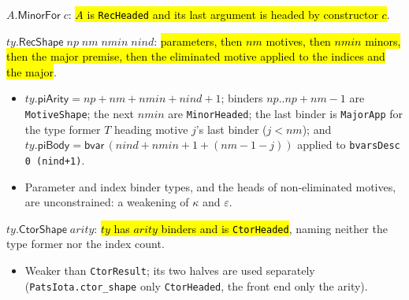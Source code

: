 \begin{definition}
\label{def:ind-minor-for}
\leanok
{} 

 $A.\mathsf{MinorFor}\;c$: \hl{$A$ is \texttt{RecHeaded} and its last argument
is headed by constructor $c$}.
\end{definition}

\begin{definition}
\label{def:ind-rec-shape}
\leanok
{} 

 $ty.\mathsf{RecShape}\;np\;nm\;nmin\;nind$: \hl{parameters, then $nm$
motives, then $nmin$ minors, then the major premise, then the eliminated motive applied to
the indices and the major}.
\begin{itemize}
\item $ty.\mathsf{piArity} = np+nm+nmin+nind+1$; binders $np..np{+}nm{-}1$ are
\texttt{MotiveShape}; the next $nmin$ are \texttt{MinorHeaded}; the last binder is
\texttt{MajorApp} for the type former $T$ heading motive $j$'s last binder ($j<nm$); and
$ty.\mathsf{piBody} = \mathsf{bvar}\,(nind+nmin+1+(nm-1-j))$ applied to
\texttt{bvarsDesc 0 (nind+1)}.
\item Parameter and index binder types, and the heads of non-eliminated motives, are
unconstrained: a weakening of $\kappa$ and $\varepsilon$.
\end{itemize}
\end{definition}

\begin{definition}
\label{def:ind-ctor-shape}
\leanok
{} 

 $ty.\mathsf{CtorShape}\;arity$: \hl{$ty$ has $arity$ binders and is
\texttt{CtorHeaded}}, naming neither the type former nor the index count.
\begin{itemize}
\item Weaker than \texttt{CtorResult}; its two halves are used separately
(\texttt{PatsIota.ctor\_shape} only \texttt{CtorHeaded}, the front end
 only the arity).
\end{itemize}
\end{definition}


